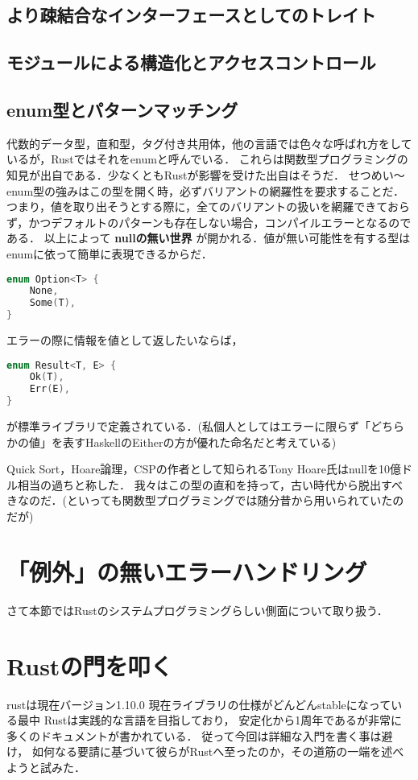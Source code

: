 \subsection{より疎結合なインターフェースとしてのトレイト}


\subsection{モジュールによる構造化とアクセスコントロール}


\subsection{enum型とパターンマッチング}
代数的データ型，直和型，タグ付き共用体，他の言語では色々な呼ばれ方をしているが，Rustではそれをenumと呼んでいる．
これらは関数型プログラミングの知見が出自である．少なくともRustが影響を受けた出自はそうだ．
せつめい〜
enum型の強みはこの型を開く時，必ずバリアントの網羅性を要求することだ．
つまり，値を取り出そうとする際に，全てのバリアントの扱いを網羅できておらず，かつデフォルトのパターンも存在しない場合，コンパイルエラーとなるのである．
以上によって \textbf{nullの無い世界} が開かれる．値が無い可能性を有する型はenumに依って簡単に表現できるからだ．
\begin{lstlisting}[language={C++},caption=Option型,label=option_t]
enum Option<T> {
    None,
    Some(T),
}
\end{lstlisting}
エラーの際に情報を値として返したいならば，
\begin{lstlisting}[language={C++},caption=Result型,label=result_t]
enum Result<T, E> {
    Ok(T),
    Err(E),
}
\end{lstlisting}
が標準ライブラリで定義されている．(私個人としてはエラーに限らず「どちらかの値」を表すHaskellのEitherの方が優れた命名だと考えている)

Quick Sort，Hoare論理，CSPの作者として知られるTony Hoare氏はnullを10億ドル相当の過ちと称した．
我々はこの型の直和を持って，古い時代から脱出すべきなのだ．(といっても関数型プログラミングでは随分昔から用いられていたのだが)

\section{「例外」の無いエラーハンドリング}
さて本節ではRustのシステムプログラミングらしい側面について取り扱う．

\section{Rustの門を叩く}
rustは現在バージョン1.10.0
現在ライブラリの仕様がどんどんstableになっている最中
Rustは実践的な言語を目指しており，
安定化から1周年であるが非常に多くのドキュメントが書かれている．
従って今回は詳細な入門を書く事は避け，
如何なる要請に基づいて彼らがRustへ至ったのか，その道筋の一端を述べようと試みた．

